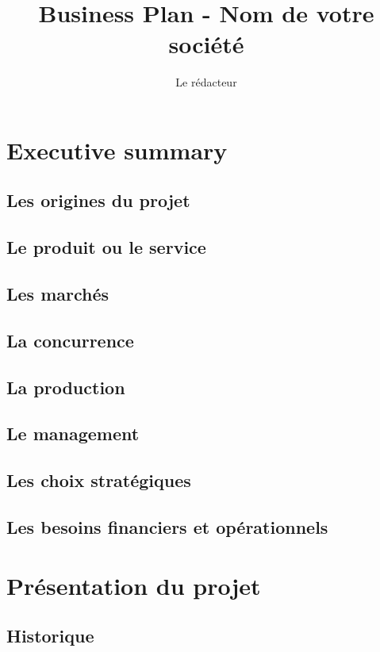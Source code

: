 \documentclass[a4paper]{report}
\title{Business Plan - Nom de votre société}
\author{Le rédacteur}
\begin{document}
\maketitle

\tableofcontents

\chapter{Executive summary}

\section{Les origines du projet}

\section{Le produit ou le service}

\section{Les marchés}

\section{La concurrence}

\section{La production}

\section{Le management}

\section{Les choix stratégiques}

\section{Les besoins financiers et opérationnels}

\chapter{Présentation du projet}

\section{Historique}
\end{document}
